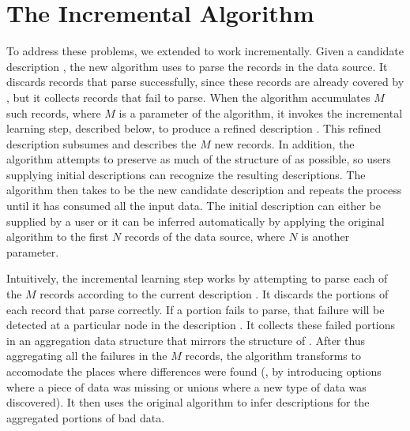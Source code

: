 \section{The Incremental Algorithm}
\label{sec:algo}
To address these problems, we extended \learnpads{} to work incrementally.  
Given a candidate description , the new algorithm uses  to parse
the records in the data source.  
It discards records that parse successfully, since these records are
already covered by , but it collects records that fail to parse.
When the algorithm accumulates $M$ such records, where $M$ is a
parameter of the algorithm, it invokes the incremental learning step,
described below, to produce a refined description .  This refined
description subsumes  and describes the $M$
new records.  In addition, the algorithm attempts to preserve as much
of the structure of  as possible, so users supplying initial
descriptions can recognize the resulting descriptions. 
The algorithm then takes 
to be the new candidate description and repeats the process until it
has consumed all the input data.
The initial description  can either be supplied by a user or it
can be inferred automatically by applying the original algorithm to
the first $N$ records of the data source, where $N$ is another
parameter.

Intuitively, the incremental learning step works by attempting to
parse each of the $M$ records according to the current description
.  It discards the portions of each record that parse correctly.
If a portion fails to parse, that failure will be detected at a
particular node in the description . It collects these failed
portions in an aggregation data structure  that mirrors the
structure of .  After thus aggregating all the failures in the $M$
records, the algorithm transforms  to accomodate the places where
differences were found (\ie, by introducing options where a piece of
data was missing or unions where a new type of data was discovered).
It then uses the original \learnpads{} algorithm to infer descriptions
for the aggregated portions of bad data. 

